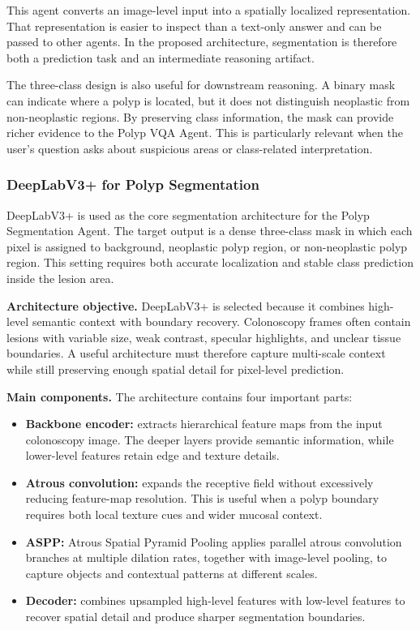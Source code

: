 This agent converts an image-level input into a spatially localized representation. That representation is easier to inspect than a text-only answer and can be passed to other agents. In the proposed architecture, segmentation is therefore both a prediction task and an intermediate reasoning artifact.

The three-class design is also useful for downstream reasoning. A binary mask can indicate where a polyp is located, but it does not distinguish neoplastic from non-neoplastic regions. By preserving class information, the mask can provide richer evidence to the Polyp VQA Agent. This is particularly relevant when the user's question asks about suspicious areas or class-related interpretation.

\subsubsection{DeepLabV3+ for Polyp Segmentation}

DeepLabV3+ is used as the core segmentation architecture for the Polyp Segmentation Agent. The target output is a dense three-class mask in which each pixel is assigned to background, neoplastic polyp region, or non-neoplastic polyp region. This setting requires both accurate localization and stable class prediction inside the lesion area.

\textbf{Architecture objective.} DeepLabV3+ is selected because it combines high-level semantic context with boundary recovery. Colonoscopy frames often contain lesions with variable size, weak contrast, specular highlights, and unclear tissue boundaries. A useful architecture must therefore capture multi-scale context while still preserving enough spatial detail for pixel-level prediction.

\textbf{Main components.} The architecture contains four important parts:

\begin{itemize}
    \item \textbf{Backbone encoder:} extracts hierarchical feature maps from the input colonoscopy image. The deeper layers provide semantic information, while lower-level features retain edge and texture details.
    \item \textbf{Atrous convolution:} expands the receptive field without excessively reducing feature-map resolution. This is useful when a polyp boundary requires both local texture cues and wider mucosal context.
    \item \textbf{ASPP:} Atrous Spatial Pyramid Pooling applies parallel atrous convolution branches at multiple dilation rates, together with image-level pooling, to capture objects and contextual patterns at different scales.
    \item \textbf{Decoder:} combines upsampled high-level features with low-level features to recover spatial detail and produce sharper segmentation boundaries.
\end{itemize}

